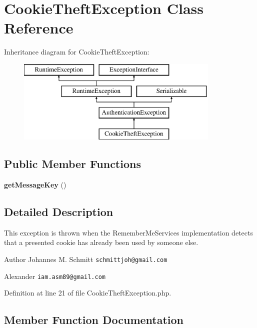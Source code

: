 \section{Cookie\+Theft\+Exception Class Reference}
\label{class_symfony_1_1_component_1_1_security_1_1_core_1_1_exception_1_1_cookie_theft_exception}
Inheritance diagram for Cookie\+Theft\+Exception\+:\begin{figure}[H]
\begin{center}
\leavevmode
\includegraphics[height=4.000000cm]{class_symfony_1_1_component_1_1_security_1_1_core_1_1_exception_1_1_cookie_theft_exception}
\end{center}
\end{figure}
\subsection*{Public Member Functions}
\begin{DoxyCompactItemize}
\item 
{\bf get\+Message\+Key} ()
\end{DoxyCompactItemize}


\subsection{Detailed Description}
This exception is thrown when the Remember\+Me\+Services implementation detects that a presented cookie has already been used by someone else.

\begin{DoxyAuthor}{Author}
Johannes M. Schmitt {\tt schmittjoh@gmail.\+com} 

Alexander {\tt iam.\+asm89@gmail.\+com} 
\end{DoxyAuthor}


Definition at line 21 of file Cookie\+Theft\+Exception.\+php.



\subsection{Member Function Documentation}
